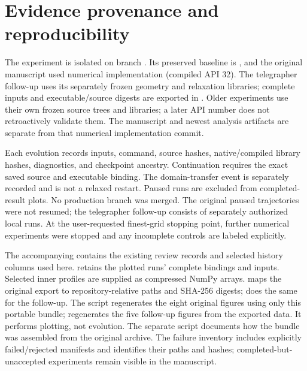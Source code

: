 \section{Evidence provenance and reproducibility}
\label{app:repro}
The experiment is isolated on branch . Its preserved baseline is , and the original manuscript used numerical implementation  (compiled API 32). The telegrapher follow-up uses its separately frozen geometry and relaxation libraries; complete inputs and executable/source digests are exported in . Older experiments use their own frozen source trees and libraries; a later API number does not retroactively validate them. The manuscript and newest analysis artifacts are separate from that numerical implementation commit.

Each evolution records inputs, command, source hashes, native/compiled library hashes, diagnostics, and checkpoint ancestry. Continuation requires the exact saved source and executable binding. The domain-transfer event is separately recorded and is not a relaxed restart. Paused runs are excluded from completed-result plots. No production branch was merged. The original paused trajectories were not resumed; the telegrapher follow-up consists of separately authorized local runs. At the user-requested finest-grid stopping point, further numerical experiments were stopped and any incomplete controls are labeled explicitly.

The accompanying  contains the existing review records and selected history columns used here.  retains the plotted runs' complete bindings and inputs. Selected inner profiles are supplied as compressed NumPy arrays.  maps the original export to repository-relative paths and SHA-256 digests;  does the same for the follow-up. The  script regenerates the eight original figures using only this portable bundle;  regenerates the five follow-up figures from the exported data. It performs plotting, not evolution. The separate  script documents how the bundle was assembled from the original archive. The failure inventory includes explicitly failed/rejected manifests and identifies their paths and hashes; completed-but-unaccepted experiments remain visible in the manuscript.

